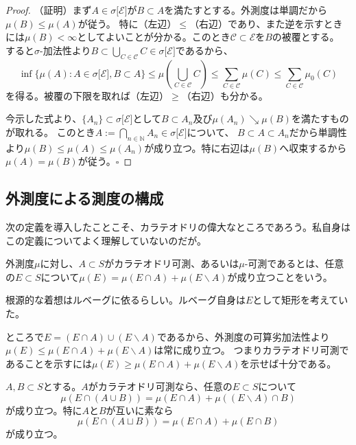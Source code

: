 \documentclass[../root.tex]{subfiles}
\begin{document}
\begin{proof}
（証明）まず$ A\in\sigma\lbrack \mathscr{E} \rbrack $が$ B\subset A $を満たすとする。外測度は単調だから$ \mu( B )\le\mu( A ) $が従う。
特に（左辺）$ \le $（右辺）であり、また逆を示すときには$ \mu( B )\lt\infty $としてよいことが分かる。このとき$ \mathscr{C}\subset\mathscr{E} $を$ B $の被覆とする。
すると$ \sigma $-加法性より$ B\subset\bigcup_{C\in\mathscr{C}}C\in\sigma\lbrack \mathscr{E} \rbrack $であるから、
\[ \inf\lbrace \mu( A ) : A\in\sigma\lbrack \mathscr{E} \rbrack, B\subset A \rbrace \le \mu\left( \bigcup_{C\in\mathscr{C}}C \right) \le \sum_{C\in\mathscr{C}}\mu( C ) \le \sum_{C\in\mathscr{C}}\mu_{0}( C ) \]
を得る。被覆の下限を取れば（左辺）$ \ge $（右辺）も分かる。

今示した式より、$ \lbrace A_{n} \rbrace\subset\sigma\lbrack \mathscr{E} \rbrack $として$ B\subset A_{n} $及び$ \mu( A_{n} )\searrow\mu( B ) $を満たすものが取れる。
このとき$ A:=\bigcap_{n\in\mathbb{N}}A_{n}\in\sigma\lbrack \mathscr{E} \rbrack $について、
$ B\subset A\subset A_{n} $だから単調性より$ \mu( B )\le\mu( A )\le\mu( A_{n} ) $が成り立つ。特に右辺は$ \mu( B ) $へ収束するから$ \mu( A )=\mu( B ) $が従う。$ \square $
\end{proof}




\subsection{外測度による測度の構成}
次の定義を導入したことこそ、カラテオドリの偉大なところであろう。私自身はこの定義についてよく理解していないのだが。

\begin{Def}{}{}
外測度$ \mu $に対し、$ A\subset S $がカラテオドリ可測、あるいは$ \mu $-可測であるとは、任意の$ E\subset S $について$ \mu( E )=\mu( E\cap A )+\mu( E\backslash A ) $が成り立つことをいう。
\end{Def}

根源的な着想はルベーグに依るらしい。ルベーグ自身は$ E $として矩形を考えていた。

ところで$ E=( E\cap A )\cup( E\backslash A ) $であるから、外測度の可算劣加法性より$ \mu( E )\le\mu( E\cap A )+\mu( E\backslash A ) $は常に成り立つ。
つまりカラテオドリ可測であることを示すには$ \mu( E )\ge\mu( E\cap A )+\mu( E\backslash A ) $を示せば十分である。

\begin{Lem}{}{}
$ A, B\subset S $とする。$ A $がカラテオドリ可測なら、任意の$ E\subset S $について
\[ \mu( E\cap( A\cup B ) ) = \mu( E\cap A )+\mu( ( E\backslash A )\cap B ) \]
が成り立つ。特に$ A $と$ B $が互いに素なら
\[ \mu( E\cap( A\sqcup B ) ) = \mu( E\cap A )+\mu( E\cap B ) \]
が成り立つ。
\end{Lem}
\end{document}
